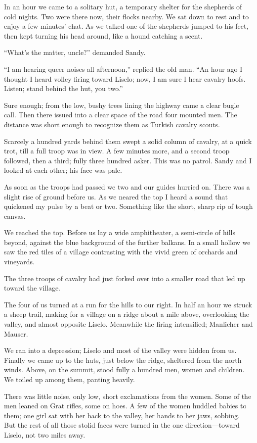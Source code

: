 \documentclass[a5paper,12pt]{book}
\begin{document}
In an hour we came to a solitary hut, a temporary shelter for the shepherds of cold nights. Two were there now, their flocks nearby. We sat down to rest and to enjoy a few minutes’ chat. As we talked one of the shepherds jumped to his feet, then kept turning his head around, like a hound catching a scent.

“What’s the matter, uncle?” demanded Sandy.

“I am hearing queer noises all afternoon,” replied the old man. “An hour ago I thought I heard volley firing toward Liselo; now, I am sure I hear cavalry hoofs. Listen; stand behind the hut, you two.”

Sure enough; from the low, bushy trees lining the highway came a clear bugle call. Then there issued into a clear space of the road four mounted men. The distance was short enough to recognize them as Turkish cavalry scouts.

Scarcely a hundred yards behind them swept a solid column of cavalry, at a quick trot, till a full troop was in view. A few minutes more, and a second troop followed, then a third; fully three hundred asker. This was no patrol. Sandy and I looked at each other; his face was pale.

As soon as the troops had passed we two and our guides hurried on. There was a slight rise of ground before us. As we neared the top I heard a sound that quickened my pulse by a beat or two. Something like the short, sharp rip of tough canvas.

We reached the top. Before us lay a wide amphitheater, a semi-circle of hills beyond, against the blue background of the further balkans. In a small hollow we saw the red tiles of a village contrasting with the vivid green of orchards and vineyards.

The three troops of cavalry had just forked over into a smaller road that led up toward the village.

The four of us turned at a run for the hills to our right. In half an hour we struck a sheep trail, making for a village on a ridge about a mile above, overlooking the valley, and almost opposite Liselo. Meanwhile the firing intensified; Manlicher and Mauser.

We ran into a depression; Liselo and most of the valley were hidden from us. Finally we came up to the huts, just below the ridge, sheltered from the north winds. Above, on the summit, stood fully a hundred men, women and children. We toiled up among them, panting heavily.

There was little noise, only low, short exclamations from the women. Some of the men leaned on Grat rifles, some on hoes. A few of the women huddled babies to them; one girl sat with her back to the valley, her hands to her jaws, sobbing. But the rest of all those stolid faces were turned in the one direction—toward Liselo, not two miles away.
\end{document}
